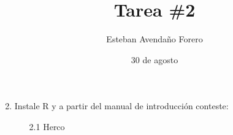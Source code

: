 \documentclass[letterpaper, 12pt]{article}
\title{Tarea \#2}
\author{Esteban Avendaño Forero}
\date{30 de agosto}
\begin{document}

\maketitle

\begin{enumerate}
\setcounter{enumi}{1}
\item Instale R y a partir del manual de introducción conteste:
\begin{enumerate}
\item[2.1] Herco
\end{enumerate}
\end{enumerate}
\end{document}
